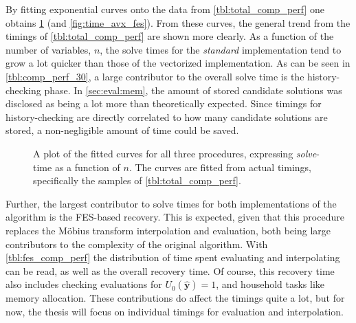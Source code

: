 By fitting exponential curves onto the data from \cref{tbl:total_comp_perf} one obtains \cref{fig:time_dinur_fes} (and \cref{fig:time_avx_fes}). From these curves, the general trend from the timings of \cref{tbl:total_comp_perf} are shown more clearly. As a function of the number of variables, $n$, the solve times for the \textit{standard} implementation tend to grow a lot quicker than those of the vectorized implementation. As can be seen in \cref{tbl:comp_perf_30}, a large contributor to the overall solve time is the history-checking phase. In \cref{sec:eval:mem}, the amount of stored candidate solutions was disclosed as being a lot more than theoretically expected. Since timings for history-checking are directly correlated to how many candidate solutions are stored, a non-negligible amount of time could be saved.

\begin{figure}[t]
    \centering
    \caption{A plot of the fitted curves for all three procedures, expressing \textit{solve}-time as a function of $n$. The curves are fitted from actual timings, specifically the samples of \cref{tbl:total_comp_perf}.} \label{fig:time_dinur_fes}
\end{figure}

Further, the largest contributor to solve times for both implementations of the algorithm is the FES-based recovery. This is expected, given that this procedure replaces the Möbius transform interpolation and evaluation, both being large contributors to the complexity of the original algorithm. With \cref{tbl:fes_comp_perf} the distribution of time spent evaluating and interpolating can be read, as well as the overall recovery time. Of course, this recovery time also includes checking evaluations for $U_0(\hat{\mathbf{y}}) = 1$, and household tasks like memory allocation. These contributions do affect the timings quite a lot, but for now, the thesis will focus on individual timings for evaluation and interpolation.

